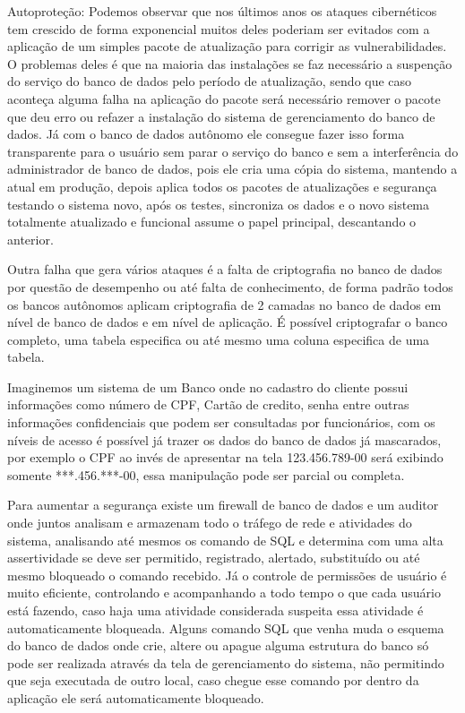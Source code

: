 \begin{alineas}
	
	\item Autoproteção: Podemos observar que nos últimos anos os ataques cibernéticos tem crescido de forma exponencial muitos deles poderiam ser evitados com a aplicação de um simples pacote de atualização para corrigir as vulnerabilidades. O problemas deles é que na maioria das instalações se faz necessário a suspenção do serviço do banco de dados pelo período de atualização, sendo que caso aconteça alguma falha na aplicação do pacote será necessário remover o pacote que deu erro ou refazer a instalação do sistema de gerenciamento do banco de dados. Já com o banco de dados autônomo ele consegue fazer isso forma transparente para o usuário sem parar o serviço do banco e sem a interferência do administrador de banco de dados, pois ele cria uma cópia do sistema, mantendo a atual em produção, depois aplica todos os pacotes de atualizações e segurança testando o sistema novo, após os testes, sincroniza os dados e o novo sistema totalmente atualizado e funcional assume o papel principal, descantando o anterior.
	 
	Outra falha que gera vários ataques é a falta de criptografia no banco de dados por questão de desempenho ou até falta de conhecimento, de forma padrão todos os bancos autônomos aplicam criptografia de 2 camadas no banco de dados em nível de banco de dados e em nível de aplicação. É possível criptografar o banco completo, uma tabela especifica ou até mesmo uma coluna especifica de uma tabela.
	
	Imaginemos um sistema de um Banco onde no cadastro do cliente possui informações como número de CPF, Cartão de credito, senha entre outras informações confidenciais que podem ser consultadas por funcionários, com os níveis de acesso é possível já trazer os dados do banco de dados já mascarados, por exemplo o CPF ao invés de apresentar na tela 123.456.789-00 será exibindo somente ***.456.***-00, essa manipulação pode ser parcial ou completa.
	
	Para aumentar a segurança existe um firewall de banco de dados  e um auditor onde juntos analisam e armazenam todo o tráfego de rede e atividades do sistema, analisando até mesmos os comando de SQL e determina com uma alta assertividade se deve ser permitido, registrado, alertado, substituído ou até mesmo bloqueado o comando recebido. Já o controle de permissões de usuário é muito eficiente, controlando e acompanhando a todo tempo o que cada usuário está fazendo, caso haja uma atividade considerada suspeita essa atividade é automaticamente bloqueada. Alguns comando SQL que venha muda o esquema do banco de dados onde crie, altere ou apague alguma estrutura do banco só pode ser realizada através da tela de gerenciamento do sistema, não permitindo que seja executada de outro local, caso chegue esse comando por dentro da aplicação ele será automaticamente bloqueado.
	

\end{alineas}
